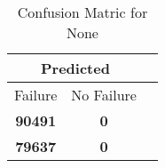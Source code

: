\begin{table}[] 
\caption{Confusion Matric for None} 
\label{Table: Prediction Accuracy-DMDNoneNoneEKF-top2Reflection-Reflection} 
\centering 
\begin{tabular} 
 {@{}ccc@{}} 
\toprule 
\multicolumn{2}{c}{\textbf{Predicted}}
 \\ \midrule 
\multicolumn{1}{|c|}{Failure} & 
\multicolumn{1}{c|}{No Failure}
 \\ \midrule 
\multicolumn{1}{|c|}{\color{green}\textbf{90491}} & 
\multicolumn{1}{c|}{\color{green}\textbf{0}}
 \\ \midrule 
\multicolumn{1}{|c|}{\color{red}\textbf{79637}} & 
\multicolumn{1}{c|}{\color{green}\textbf{0}}
 \\ \bottomrule 
\end{tabular} 
\end{table} 
